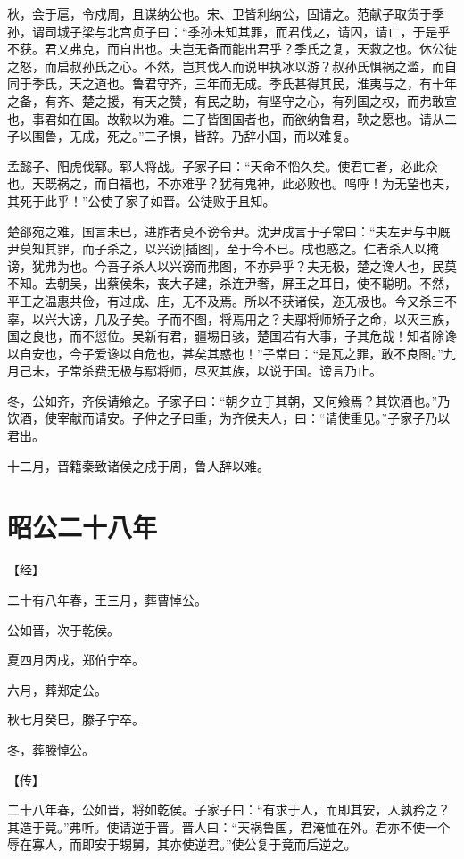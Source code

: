 \documentclass[a4paper,12pt,UTF8,twoside]{ctexbook}
\begin{document}
秋，会于扈，令戍周，且谋纳公也。宋、卫皆利纳公，固请之。范献子取货于季孙，谓司城子梁与北宫贞子曰：“季孙未知其罪，而君伐之，请囚，请亡，于是乎不获。君又弗克，而自出也。夫岂无备而能出君乎？季氏之复，天救之也。休公徒之怒，而启叔孙氏之心。不然，岂其伐人而说甲执冰以游？叔孙氏惧祸之滥，而自同于季氏，天之道也。鲁君守齐，三年而无成。季氏甚得其民，淮夷与之，有十年之备，有齐、楚之援，有天之赞，有民之助，有坚守之心，有列国之权，而弗敢宣也，事君如在国。故鞅以为难。二子皆图国者也，而欲纳鲁君，鞅之愿也。请从二子以围鲁，无成，死之。”二子惧，皆辞。乃辞小国，而以难复。

孟懿子、阳虎伐郓。郓人将战。子家子曰：“天命不慆久矣。使君亡者，必此众也。天既祸之，而自福也，不亦难乎？犹有鬼神，此必败也。呜呼！为无望也夫，其死于此乎！”公使子家子如晋。公徒败于且知。

楚郤宛之难，国言未已，进胙者莫不谤令尹。沈尹戌言于子常曰：“夫左尹与中厩尹莫知其罪，而子杀之，以兴谤[插图]，至于今不已。戌也惑之。仁者杀人以掩谤，犹弗为也。今吾子杀人以兴谤而弗图，不亦异乎？夫无极，楚之谗人也，民莫不知。去朝吴，出蔡侯朱，丧大子建，杀连尹奢，屏王之耳目，使不聪明。不然，平王之温惠共俭，有过成、庄，无不及焉。所以不获诸侯，迩无极也。今又杀三不辜，以兴大谤，几及子矣。子而不图，将焉用之？夫鄢将师矫子之命，以灭三族，国之良也，而不愆位。吴新有君，疆埸日骇，楚国若有大事，子其危哉！知者除谗以自安也，今子爱谗以自危也，甚矣其惑也！”子常曰：“是瓦之罪，敢不良图。”九月己未，子常杀费无极与鄢将师，尽灭其族，以说于国。谤言乃止。

冬，公如齐，齐侯请飨之。子家子曰：“朝夕立于其朝，又何飨焉？其饮酒也。”乃饮酒，使宰献而请安。子仲之子曰重，为齐侯夫人，曰：“请使重见。”子家子乃以君出。

十二月，晋籍秦致诸侯之戍于周，鲁人辞以难。


\section{昭公二十八年}



【经】

二十有八年春，王三月，葬曹悼公。

公如晋，次于乾侯。

夏四月丙戌，郑伯宁卒。

六月，葬郑定公。

秋七月癸巳，滕子宁卒。

冬，葬滕悼公。

【传】

二十八年春，公如晋，将如乾侯。子家子曰：“有求于人，而即其安，人孰矜之？其造于竟。”弗听。使请逆于晋。晋人曰：“天祸鲁国，君淹恤在外。君亦不使一个辱在寡人，而即安于甥舅，其亦使逆君。”使公复于竟而后逆之。
\end{document}
